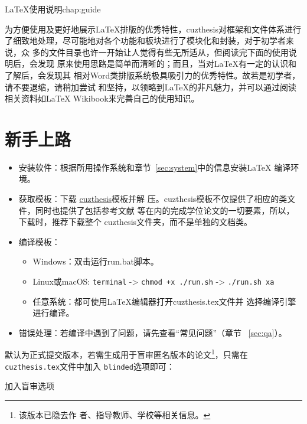 \begin{cuzchapter}{\LaTeX{}使用说明}{chap:guide}

	为方便使用及更好地展示\LaTeX{}排版的优秀特性，cuzthesis对框架和文件体系进行
	了细致地处理，尽可能地对各个功能和板块进行了模块化和封装，对于初学者来说，众
	多的文件目录也许一开始让人觉得有些无所适从，但阅读完下面的使用说明后，会发现
	原来使用思路是简单而清晰的；而且，当对\LaTeX{}有一定的认识和了解后，会发现其
	相对Word类排版系统极具吸引力的优秀特性。故若是初学者，请不要退缩，请稍加尝试
	和坚持，以领略到\LaTeX{}的非凡魅力，并可以通过阅读相关资料如\LaTeX{}
	Wikibook\citep{wikibook2014latex}来完善自己的使用知识。

	\section{新手上路}\label{sec:newbie}

	\begin{itemize}
		\item 安装软件：根据所用操作系统和章节~\ref{sec:system}中的信息安装\LaTeX{}
		      编译环境。
		\item 获取模板：下载
		      \href{https://github.com/xiehao/CUZThesis}{cuzthesis}模板并解
		      压。cuzthesis模板不仅提供了相应的类文件，同时也提供了包括参考文献
		      等在内的完成学位论文的一切要素，所以，下载时，推荐下载整个
		      cuzthesis文件夹，而不是单独的文档类。
		\item 编译模板：
		      \begin{itemize}
			      \item Windows：双击运行run.bat脚本。
			      \item Linux或macOS: {\small \verb|terminal| -> \verb|chmod +x ./run.sh| -> \verb|./run.sh xa|}
			      \item 任意系统：都可使用\LaTeX{}编辑器打开cuzthesis.tex文件并
			            选择编译引擎进行编译。
		      \end{itemize}
		\item 错误处理：若编译中遇到了问题，请先查看“常见问题”（章节
		      ~\ref{sec:qa}）。
	\end{itemize}

	默认为正式提交版本，若需生成用于盲审匿名版本的论文\footnote{该版本已隐去作
		者、指导教师、学校等相关信息。}，只需在\texttt{cuzthesis.tex}文件中加入
	\texttt{blinded}选项即可：
	\begin{listing}[H]
        \centering
		\caption{加入盲审选项}
	\end{listing}



\end{cuzchapter}

